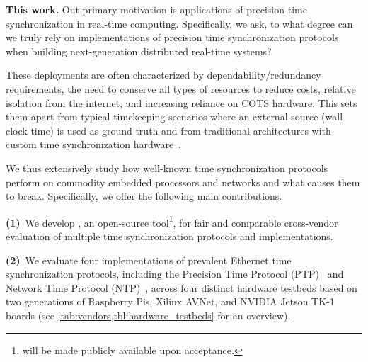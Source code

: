 \textbf{This work.}
Out primary motivation is applications of precision time synchronization in real-time computing.
Specifically, we ask, to what degree can we truly rely on implementations of precision time synchronization protocols
when building next-generation distributed real-time systems? %

These deployments %
are often %
characterized by dependability/redundancy requirements,
the need to conserve all types of resources to reduce costs,
relative isolation from the internet, %
and increasing reliance on COTS hardware.
This sets them apart from typical timekeeping scenarios where an external source
(wall-clock time) is used as ground truth
and from traditional architectures with custom time synchronization hardware~\cite{wensley1978sift,hopkins1978ftmp}.

We thus extensively study how well-known time synchronization protocols perform
on commodity embedded processors and networks and what causes them to break.
Specifically, we offer the following main contributions.

\textbf{(1)}~We develop \toolName{}, an open-source tool\footnote{\toolName{} will be made publicly available upon acceptance.}, for fair and comparable cross-vendor evaluation of multiple time synchronization protocols and implementations.

\textbf{(2)}~We evaluate %
four implementations of prevalent Ethernet time synchronization protocols, %
including the Precision Time Protocol (PTP)~\cite{ptp-spec} and Network Time Protocol (NTP)~\cite{ntpv4-spec},
across four distinct hardware testbeds
based on two generations of Raspberry Pis,
Xilinx AVNet, and NVIDIA Jetson TK-1 boards (see \cref{tab:vendors,tbl:hardware_testbeds} for an overview).

